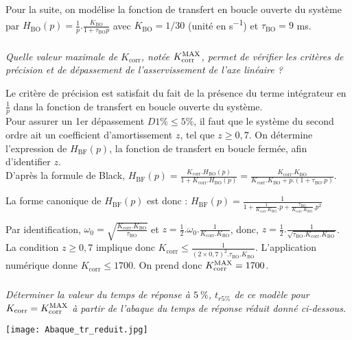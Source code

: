 \begin{multicols}{2}
\ifprof
\else
Pour la suite, on modélise la fonction de transfert en boucle ouverte du système par \linebreak $H_{\text{BO}}(p) = \frac{1}{p}.\frac{K_{\text{BO}}}{1+\tau_{\text{BO}}p}$ avec $K_{\text{BO}} = 1/30$ (unité en \si{s^{-1}}) et $\tau_{\text{BO}} = 9$ ms.
\fi

\subparagraph{}\textit{Quelle valeur maximale de $K_{\text{corr}}$, notée $K_{\text{corr}}^{\text{\text{MAX}}}$, permet de vérifier les critères de précision et de dépassement de l'asservissement de l'axe linéaire ?}

\ifprof
\begin{corrige}
Le critère de précision est satisfait du fait de la présence du terme intégrateur en $\frac{1}{p}$ dans la fonction de transfert en boucle ouverte du système.\\
Pour assurer un 1er dépassement $D1\% \leq 5 \%$, il faut que le système du second ordre ait un coefficient d'amortissement $z$, tel que $z \ge 0,7$. On détermine l'expression de $H_{\text{BF}}(p)$, la fonction de transfert en boucle fermée, afin d'identifier $z$.\\
D'après la formule de Black, $H_{\text{BF}}(p) = \frac{K_{\text{corr}}.H_{\text{BO}}(p)}{1+K_{\text{corr}}.H_{\text{BO}}(p)} = \frac{K_{\text{corr}}.K_{\text{BO}}}{K_{\text{corr}}.K_{\text{BO}} + p.\left( 1+ \tau_{\text{BO}}.p \right)}$.

La forme canonique de $H_{\text{BF}}(p)$ est donc :
$H_{\text{BF}}(p) = \frac{1}{1+\frac{1}{K_{\text{corr}}.K_{\text{BO}}}.p+ \frac{\tau_{\text{BO}}}{K_{\text{corr}}.K_{\text{BO}}}.p^2} $

Par identification,
$\omega_0 = \sqrt{\frac{K_{\text{corr}}.K_{\text{BO}}}{\tau_{\text{BO}}}} $ et $z=\frac{1}{2}.\omega_0.\frac{1}{K_{\text{corr}}.K_{\text{BO}}}$,
donc, $z = \frac{1}{2}.\frac{1}{\sqrt{\tau_{\text{BO}}.K_{\text{corr}}.K_{\text{BO}}}}$.
La condition $z \ge 0,7$ implique donc $K_{\text{corr}} \leq \frac{1}{(2 \times 0,7)^2.\tau_{\text{BO}}.K_{\text{BO}}}$.
L'application numérique donne $K_{\text{corr}} \leq 1700$. On prend donc $K_{\text{corr}}^{\text{\text{MAX}}} = 1700$.
\end{corrige}
\fi



\subparagraph{}\textit{Déterminer la valeur du temps de réponse à $5\ \%$, $t_{r5\%}$ de ce modèle pour $K_{\text{corr}} = K_{\text{corr}}^{\text{\text{MAX}}}$ à partir de l'abaque du temps de réponse réduit donné ci-dessous.}
\ifprof
\else
\begin{center}
\texttt{[image: Abaque\_tr\_reduit.jpg]}
\end{center}
\fi


\end{multicols}
